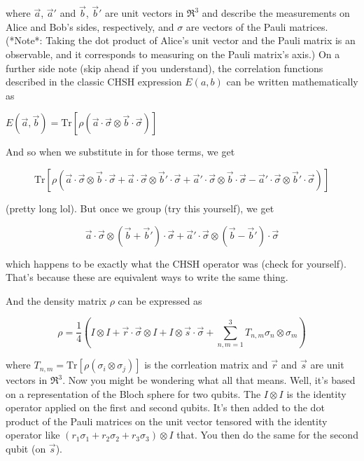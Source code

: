 \documentclass[a4paper, onecolumn, 11pt, titlepage]{quantumarticle}
\begin{document}
\begin{appendices}
where $\vec{a}$, $\vec{a}'$ and $\vec{b}$, $\vec{b}'$ are unit vectors in $\mathfrak{R}^3$ and describe the measurements on Alice and Bob's sides, respectively, and $\sigma$ are vectors of the Pauli matrices. (*Note*: Taking the dot product of Alice's unit vector and the Pauli matrix is an observable, and it corresponds to measuring on the Pauli matrix's axis.) On a further side note (skip ahead if you understand), the correlation functions described in the classic CHSH expression $E(a, b)$ can be written mathematically as 

$E(\vec{a},\vec{b}) = \text{Tr} \left[\rho \left(\vec{a} \cdot \vec{\sigma} \otimes \vec{b} \cdot \vec{\sigma} \right) \right]$

And so when we substitute in for those terms, we get

$$ \text{Tr} \left[ \rho \left(\vec{a} \cdot \vec{\sigma} \otimes \vec{b}\cdot \vec{\sigma} + \vec{a} \cdot \vec{\sigma} \otimes \vec{b}' \cdot\vec{\sigma} + \vec{a}' \cdot \vec{\sigma} \otimes \vec{b} \cdot \vec{\sigma} - \vec{a}' \cdot \vec{\sigma} \otimes \vec{b}' \cdot \vec{\sigma} \right) \right] $$

(pretty long lol). But once we group (try this yourself), we get

$$\vec{a} \cdot \vec{\sigma} \otimes \left(\vec{b} +\vec{b}' \right) \cdot \vec{\sigma} + \vec{a}' \cdot \vec{\sigma} \otimes \left(\vec{b} - \vec{b}'\right) \cdot \vec{\sigma}$$

which happens to be exactly what the CHSH operator was (check for yourself). That's because these are equivalent ways to write the same thing.


And the density matrix $\rho$ can be expressed as 

$$\rho = \frac{1}{4}\left(I\otimes I + \vec{r} \cdot \vec{\sigma} \otimes I + I \otimes \vec{s} \cdot \vec{\sigma} + \sum_{n, m = 1}^{3}{T_{n,m}\sigma_n \otimes \sigma_m}\right) $$

where $T_{n,m} = \text{Tr} \left[\rho \left(\sigma_i \otimes \sigma_j \right)\right]$ is the corrleation matrix and $\vec{r}$ and $\vec{s}$ are unit vectors in $\mathfrak{R}^3$. Now you might be wondering what all that means. Well, it's based on a representation of the Bloch sphere for two qubits. The $I \otimes I$ is the identity operator applied on the first and second qubits. It's then added to the dot product of the Pauli matrices on the unit vector tensored with the identity operator like $(r_1 \sigma_1 +r_2 \sigma_2 + r_3 \sigma_3) \otimes I$ that. You then do the same for the second qubit (on $\vec{s}$).


\end{appendices}
\end{document}
